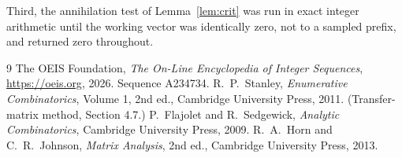 \documentclass[11pt,a4paper]{article}
\theoremstyle{plain}
\theoremstyle{definition}
\begin{document}
Third, the annihilation test of Lemma~\ref{lem:crit} was run in exact integer arithmetic
until the working vector was identically zero, not to a sampled prefix, and returned zero
throughout.

\begin{thebibliography}{9}
 The OEIS Foundation, \emph{The On-Line Encyclopedia of Integer
Sequences}, \url{https://oeis.org}, 2026. Sequence A234734.
 R.~P.~Stanley, \emph{Enumerative Combinatorics}, Volume 1, 2nd ed.,
Cambridge University Press, 2011. (Transfer-matrix method, Section 4.7.)
 P.~Flajolet and R.~Sedgewick, \emph{Analytic Combinatorics}, Cambridge
University Press, 2009.
 R.~A.~Horn and C.~R.~Johnson, \emph{Matrix Analysis}, 2nd ed., Cambridge
University Press, 2013.
\end{thebibliography}
\end{document}
